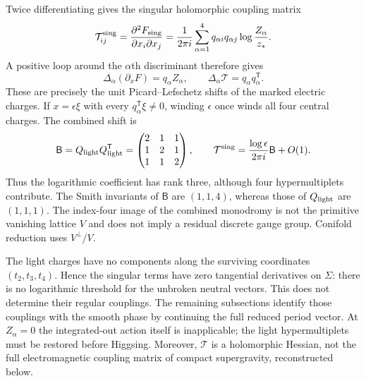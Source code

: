 Twice differentiating gives the singular holomorphic coupling matrix
\begin{equation}
 \mathcal T^{\rm sing}_{ij}
 =\frac{\partial^2F_{\rm sing}}{\partial x_i\partial x_j}
 =\frac1{2\pi i}\sum_{\alpha=1}^4
 q_{\alpha i}q_{\alpha j}\log\frac{Z_\alpha}{z_*}.
 \label{eq:x9-threshold-matrix}
\end{equation}
A positive loop around the $\alpha$th discriminant therefore gives
\begin{equation}
 \Delta_\alpha(\partial_xF)=q_\alpha Z_\alpha,\qquad
 \Delta_\alpha\mathcal T=q_\alpha q_\alpha^{\mathsf T}.
 \label{eq:x9-threshold-monodromy}
\end{equation}
These are precisely the unit Picard--Lefschetz shifts of the marked
electric charges. If $x=\epsilon\xi$ with every
$q_\alpha^{\mathsf T}\xi\ne0$, winding $\epsilon$ once winds all
four central charges. The combined shift is
\begin{equation}
 \mathsf B=Q_{\rm light}Q_{\rm light}^{\mathsf T}
 =\begin{pmatrix}2&1&1\\1&2&1\\1&1&2\end{pmatrix},\qquad
 \mathcal T^{\rm sing}
 =\frac{\log\epsilon}{2\pi i}\mathsf B+O(1).
 \label{eq:x9-threshold-total}
\end{equation}
Thus the logarithmic coefficient has rank three, although four
hypermultiplets contribute. The Smith invariants of $\mathsf B$ are
$(1,1,4)$, whereas those of $Q_{\rm light}$ are $(1,1,1)$.
The index-four image of the combined monodromy is not the primitive
vanishing lattice $V$ and does not imply a residual discrete gauge
group. Conifold reduction uses $V^\perp/V$.

The light charges have no components along the surviving coordinates
$(t_2,t_3,t_4)$. Hence the singular terms have zero tangential
derivatives on $\Sigma$: there is no logarithmic threshold for the
unbroken neutral vectors. This does not determine their regular
couplings. The remaining subsections identify those couplings with
the smooth phase by continuing the full reduced period vector.
At $Z_\alpha=0$ the integrated-out action itself is inapplicable;
the light hypermultiplets must be restored before Higgsing. Moreover,
$\mathcal T$ is a holomorphic Hessian, not the full electromagnetic
coupling matrix of compact supergravity, reconstructed below.
